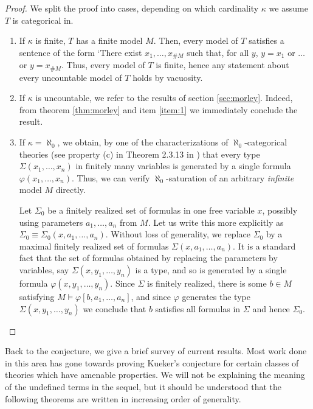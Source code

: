 \documentclass{article}
\theoremstyle{nonumberplain}
\newtheorem{proof}{Proof}
\newcommand{\card}[1]{\#{#1}}
\begin{document}
\begin{proof}
We split the proof into cases, depending on which cardinality $\kappa$ we assume $T$ is categorical in.
\begin{enumerate}
\item If $\kappa$ is finite, $T$ has a finite model $M$. Then, every model of $T$ satisfies a sentence of the form `There exist $x_1, \dots, x_{\card M}$ such that, for all $y$, $y = x_1$ or $\dots$ or $y = x_{\card M}$. Thus, every model of $T$ is finite, hence any statement about every uncountable model of $T$ holds by vacuosity.

\item If $\kappa$ is uncountable, we refer to the results of section \ref{sec:morley}. Indeed, from theorem \ref{thm:morley} and item \ref{item:1} we immediately conclude the result.

\item If $\kappa = \aleph_0$, we obtain, by one of the characterizations of $\aleph_0$-categorical theories (see property (c) in Theorem 2.3.13 in \cite{cnk}) that every type $\Sigma(x_1, \dots, x_n)$ in finitely many variables is generated by a single formula $\varphi(x_1, \dots, x_n)$. Thus, we can verify $\aleph_0$-saturation of an arbitrary \emph{infinite} model $M$ directly.

Let $\Sigma_0$ be a finitely realized set of formulas in one free variable $x$, possibly using parameters $a_1, \dots, a_n$ from $M$. Let us write this more explicitly as $\Sigma_0 \equiv \Sigma_0(x,a_1,\dots,a_n)$. Without loss of generality, we replace $\Sigma_0$ by a maximal finitely realized set of formulas $\Sigma(x,a_1, \dots, a_n)$. It is a standard fact that the set of formulas obtained by replacing the parameters by variables, say $\Sigma(x,y_1,\dots,y_n)$ is a type, and so is generated by a single formula $\varphi(x,y_1, \dots, y_n)$. Since $\Sigma$ is finitely realized, there is some $b \in M$ satisfying $M \vDash \varphi[b,a_1,\dots,a_n]$, and since $\varphi$ generates the type $\Sigma(x,y_1,\dots,y_n)$ we conclude that $b$ satisfies all formulas in $\Sigma$ and hence $\Sigma_0$.
\end{enumerate}
\end{proof}

Back to the conjecture, we give a brief survey of current results. Most work done in this area has gone towards proving Kueker's conjecture for certain classes of theories which have amenable properties. We will not be explaining the meaning of the undefined terms in the sequel, but it should be understood that the following theorems are written in increasing order of generality.
\end{document}
